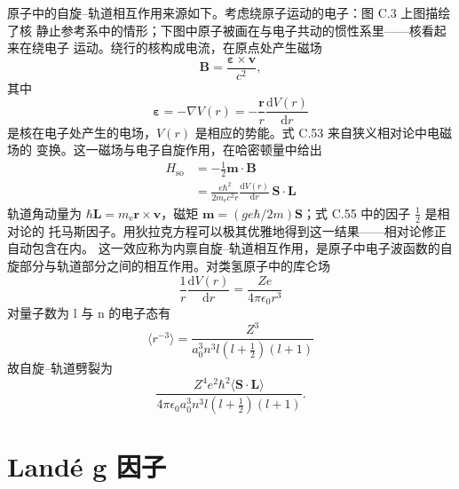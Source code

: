 原子中的自旋--轨道相互作用来源如下。考虑绕原子运动的电子：图 C.3 上图描绘了核
静止参考系中的情形；下图中原子被画在与电子共动的惯性系里——核看起来在绕电子
运动。绕行的核构成电流，在原点处产生磁场
\begin{equation*}
\mathbf{B} = \frac{\boldsymbol{\varepsilon}\times\mathbf{v}}{c^{2}},\tag{C.53}
\end{equation*}
其中
\begin{equation*}
\boldsymbol{\varepsilon} = -\nabla V(r) = -\frac{\mathbf{r}}{r}\frac{\mathrm{d}V(r)}{\mathrm{d}r}\tag{C.54}
\end{equation*}
是核在电子处产生的电场，$V(r)$ 是相应的势能。式 C.53 来自狭义相对论中电磁场的
变换。这一磁场与电子自旋作用，在哈密顿量中给出
\begin{align*}
H_{\mathrm{so}} &= -\frac{1}{2}\mathbf{m}\cdot\mathbf{B}\tag{C.55}\\
&= \frac{e\hbar^{2}}{2m_{\mathrm{e}}c^{2}r}\frac{\mathrm{d}V(r)}{\mathrm{d}r}\,\mathbf{S}\cdot\mathbf{L}\tag{C.56}
\end{align*}
轨道角动量为 $\hbar\mathbf{L}=m_{\mathrm{e}}\mathbf{r}\times\mathbf{v}$，磁矩
$\mathbf{m}=(ge\hbar/2m)\mathbf{S}$；式 C.55 中的因子 $\frac{1}{2}$ 是相对论的
托马斯因子。用狄拉克方程可以极其优雅地得到这一结果——相对论修正自动包含在内。
这一效应称为内禀自旋--轨道相互作用，是原子中电子波函数的自旋部分与轨道部分之间的相互作用。对类氢原子中的库仑场
\begin{equation*}
\frac{1}{r}\frac{\mathrm{d}V(r)}{\mathrm{d}r} = \frac{Ze}{4\pi\epsilon_0 r^{3}}\tag{C.57}
\end{equation*}
对量子数为 l 与 n 的电子态有
\begin{equation*}
\langle r^{-3}\rangle = \frac{Z^{3}}{a_0^{3}n^{3}l(l+\frac{1}{2})(l+1)}\tag{C.58}
\end{equation*}
故自旋--轨道劈裂为
\begin{equation*}
\frac{Z^{4}e^{2}\hbar^{2}\langle\mathbf{S}\cdot\mathbf{L}\rangle}{4\pi\epsilon_0 a_0^{3}n^{3}l(l+\frac{1}{2})(l+1)}.\tag{C.59}
\end{equation*}

\section{Landé g 因子}

